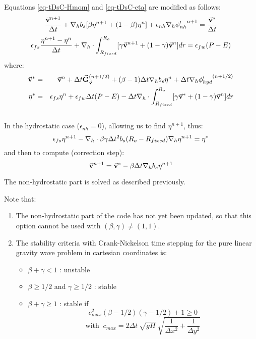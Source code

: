 Equations \ref{eq-tDsC-Hmom} and \ref{eq-tDsC-eta} are modified as follows:
$$
\frac{ \vec{\bf v}^{n+1} }{ \Delta t }
+ {\bf \nabla}_h b_s [ \beta {\eta}^{n+1} + (1-\beta) {\eta}^{n} ] 
+ \epsilon_{nh} {\bf \nabla}_h {\phi'_{nh}}^{n+1}
 = \frac{ \vec{\bf v}^* }{ \Delta t }
$$
$$
\epsilon_{fs} \frac{ {\eta}^{n+1} - {\eta}^{n} }{ \Delta t}
+ {\bf \nabla}_h \cdot \int_{R_{fixed}}^{R_o} 
[ \gamma \vec{\bf v}^{n+1} + (1-\gamma) \vec{\bf v}^{n}] dr
= \epsilon_{fw} (P-E)
$$
where:
\begin{eqnarray*}
\vec{\bf v}^* & = &
\vec{\bf v} ^{n} + \Delta t \vec{\bf G}_{\vec{\bf v}} ^{(n+1/2)}
+ (\beta-1) \Delta t {\bf \nabla}_h b_s {\eta}^{n}
+ \Delta t {\bf \nabla}_h {\phi'_{hyd}}^{(n+1/2)}
\\
{\eta}^* & = &
\epsilon_{fs} {\eta}^{n} + \epsilon_{fw} \Delta t (P-E) 
- \Delta t {\bf \nabla}_h \cdot \int_{R_{fixed}}^{R_o} 
[ \gamma \vec{\bf v}^* + (1-\gamma) \vec{\bf v}^{n}] dr
\end{eqnarray*}
\\
In the hydrostatic case ($\epsilon_{nh}=0$), allowing us to find
${\eta}^{n+1}$, thus:
$$
\epsilon_{fs} {\eta}^{n+1} -
{\bf \nabla}_h \cdot \beta\gamma \Delta t^2 b_s (R_o - R_{fixed})
{\bf \nabla}_h {\eta}^{n+1}
= {\eta}^*
$$ 
and then to compute (correction step):
$$
\vec{\bf v}^{n+1} = \vec{\bf v}^{*}
- \beta \Delta t {\bf \nabla}_h b_s {\eta}^{n+1}
$$

The non-hydrostatic part is solved as described previously. 

Note that:
\begin{enumerate}
\item The non-hydrostatic part of the code has not yet been 
updated, so that this option cannot be used with $(\beta,\gamma) \neq (1,1)$.
\item The stability criteria with Crank-Nickelson time stepping
for the pure linear gravity wave problem in cartesian coordinates is:
\begin{itemize}
\item $\beta + \gamma < 1$ : unstable
\item $\beta \geq 1/2$ and $ \gamma \geq 1/2$ : stable
\item $\beta + \gamma \geq 1$ : stable if
$$ 
c_{max}^2 (\beta - 1/2)(\gamma - 1/2) + 1 \geq 0
$$
$$
\mbox{with }~
c_{max} =  2 \Delta t \: \sqrt{g H} \: 
\sqrt{ \frac{1}{\Delta x^2} + \frac{1}{\Delta y^2} }
$$
\end{itemize}
\end{enumerate}

